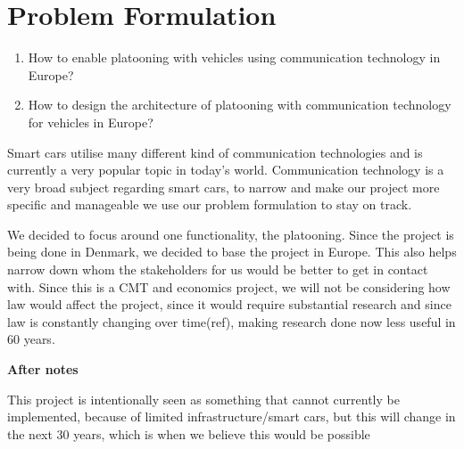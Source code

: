 \section{Problem Formulation}


\begin{enumerate}
    \item How to enable platooning with vehicles using communication technology in Europe?
    \item How to design the architecture of platooning with communication technology for vehicles in Europe?
\end{enumerate}


Smart cars utilise many different kind of communication technologies and is currently a very popular topic in today's world. Communication technology is a very broad subject regarding smart cars, to narrow and make our project more specific and manageable we use our problem formulation to stay on track.\par
We decided to focus around one functionality, the platooning. Since the project is being done in Denmark, we decided to base the project in Europe. This also helps narrow down whom the stakeholders for us would be better to get in contact with.
Since this is a CMT and economics project, we will not be considering how law would affect the project, since it would require substantial research and since law is constantly changing over time(ref), making research done now less useful in 60 years.\par
\bigskip
\textbf{After notes}\par
This project is intentionally seen as something that cannot currently be implemented, because of limited infrastructure/smart cars, but this will change in the next 30 years, which is when we believe this would be possible
